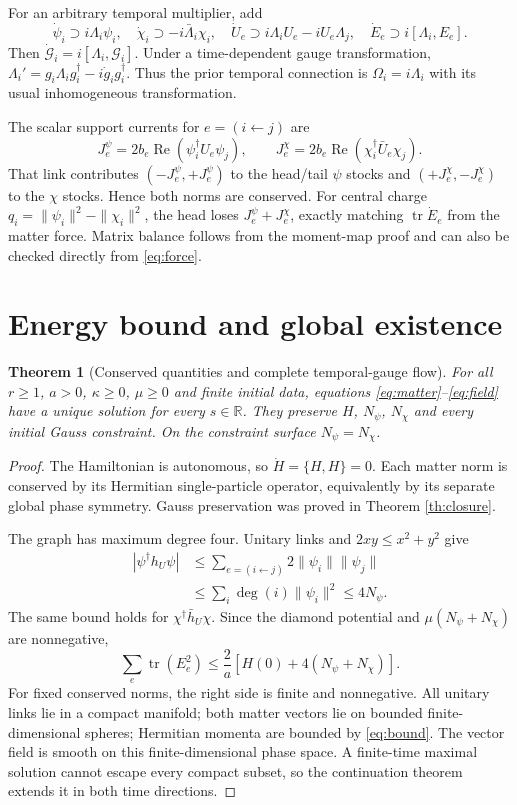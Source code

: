 \documentclass[11pt,a4paper]{article}
\newtheorem{theorem}{Theorem}\newtheorem{proposition}[theorem]{Proposition}\newtheorem{corollary}[theorem]{Corollary}
\newcommand{\tr}{\operatorname{tr}}\newcommand{\Rea}{\operatorname{Re}}\newcommand{\Ima}{\operatorname{Im}}
\begin{document}
For an arbitrary temporal multiplier, add
\[
\dot\psi_i\supset i\Lambda_i\psi_i,\quad
\dot\chi_i\supset-i\bar\Lambda_i\chi_i,\quad
\dot U_e\supset i\Lambda_iU_e-iU_e\Lambda_j,\quad
\dot E_e\supset i[\Lambda_i,E_e].
\]
Then $\dot{\mathcal G}_i=i[\Lambda_i,\mathcal G_i]$. Under a time-dependent gauge transformation,
$\Lambda_i'=g_i\Lambda_ig_i^\dagger-i\dot g_ig_i^\dagger$. Thus the prior temporal connection is $\Omega_i=i\Lambda_i$ with its usual inhomogeneous transformation.

The scalar support currents for $e=(i\leftarrow j)$ are
\[
J_e^\psi=2b_e\Rea(\psi_i^\dagger U_e\psi_j),\qquad
J_e^\chi=2b_e\Rea(\chi_i^\dagger\bar U_e\chi_j).
\]
That link contributes $(-J_e^\psi,+J_e^\psi)$ to the head/tail $\psi$ stocks and $(+J_e^\chi,-J_e^\chi)$ to the $\chi$ stocks. Hence both norms are conserved. For central charge $q_i=\|\psi_i\|^2-\|\chi_i\|^2$, the head loses $J_e^\psi+J_e^\chi$, exactly matching $\tr\dot E_e$ from the matter force. Matrix balance follows from the moment-map proof and can also be checked directly from \eqref{eq:force}.

\newpage
\section{Energy bound and global existence}
\begin{theorem}[Conserved quantities and complete temporal-gauge flow]
For all $r\geq1$, $a>0$, $\kappa\geq0$, $\mu\geq0$ and finite initial data, equations \eqref{eq:matter}--\eqref{eq:field} have a unique solution for every $s\in\mathbb R$. They preserve $H$, $N_\psi$, $N_\chi$ and every initial Gauss constraint. On the constraint surface $N_\psi=N_\chi$.
\end{theorem}
\begin{proof}
The Hamiltonian is autonomous, so $\dot H=\{H,H\}=0$. Each matter norm is conserved by its Hermitian single-particle operator, equivalently by its separate global phase symmetry. Gauss preservation was proved in Theorem \ref{th:closure}.

The graph has maximum degree four. Unitary links and $2xy\leq x^2+y^2$ give
\begin{align*}
\left|\psi^\dagger h_U\psi\right|
&\leq\sum_{e=(i\leftarrow j)}2\|\psi_i\|\|\psi_j\|\\
&\leq\sum_i\deg(i)\|\psi_i\|^2\leq4N_\psi.
\end{align*}
The same bound holds for $\chi^\dagger\bar h_U\chi$. Since the diamond potential and $\mu(N_\psi+N_\chi)$ are nonnegative,
\begin{equation}
 \sum_e\tr(E_e^2)\leq\frac{2}{a}
 \left[H(0)+4(N_\psi+N_\chi)\right].\label{eq:bound}
\end{equation}
For fixed conserved norms, the right side is finite and nonnegative. All unitary links lie in a compact manifold; both matter vectors lie on bounded finite-dimensional spheres; Hermitian momenta are bounded by \eqref{eq:bound}. The vector field is smooth on this finite-dimensional phase space. A finite-time maximal solution cannot escape every compact subset, so the continuation theorem extends it in both time directions.
\end{proof}
\end{document}
